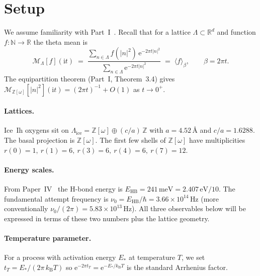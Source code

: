 \documentclass[11pt,letterpaper]{article}
\theoremstyle{plain}
\theoremstyle{definition}
\newcommand{\Eisenstein}{\mathbb{Z}[\omega]}
\newcommand{\IceLat}{\Lambda_{\text{ice}}}
\newcommand{\R}{\mathbb{R}}
\newcommand{\Z}{\mathbb{Z}}
\newcommand{\N}{\mathbb{N}}
\newcommand{\Lat}{\Lambda}
\newcommand{\tmean}[1]{\mathcal{M}_{\Lat}[#1]}
\newcommand{\tmeaneis}[1]{\mathcal{M}_{\Eisenstein}[#1]}
\newcommand{\e}{\mathrm{e}}
\newcommand{\kB}{k_{\mathrm{B}}}
\begin{document}
\tableofcontents

\bigskip

\section{Setup}\label{sec:setup}

We assume familiarity with Part~I~\cite{MamounPartI}.  Recall that
for a lattice $\Lat\subset\R^d$ and function $f:\N\to\R$ the theta
mean is
\begin{equation}\label{eq:tm}
  \tmean{f}(\mathrm{i} t)\;=\;
  \frac{\sum_{n\in\Lat} f(|n|^2)\,\e^{-2\pi t |n|^2}}
       {\sum_{n\in\Lat}\e^{-2\pi t |n|^2}}
  \;=\; \langle f\rangle_{\beta},\qquad
  \beta=2\pi t.
\end{equation}
The equipartition theorem (Part~I, Theorem~3.4) gives
$\tmeaneis{|n|^2}(\mathrm{i} t)=(2\pi t)^{-1}+O(1)$ as $t\to 0^+$.

\paragraph{Lattices.}  Ice~Ih oxygens sit on
$\IceLat = \Eisenstein \oplus (c/a)\,\Z$ with $a=4.52\,\text{\AA}$
and $c/a=1.6288$.  The basal projection is $\Eisenstein$.  The first
few shells of $\Eisenstein$ have multiplicities
$r(0)=1,\ r(1)=6,\ r(3)=6,\ r(4)=6,\ r(7)=12$.

\paragraph{Energy scales.}  From Paper~IV~\cite{MamounPaperIV} the
H-bond energy is $E_{\text{HB}}=241\,\text{meV}=2.407\,\text{eV}/10$.
The fundamental attempt frequency is $\nu_0 = E_{\text{HB}}/\hbar =
3.66\times 10^{14}\,\text{Hz}$ (more conventionally
$\nu_0/(2\pi)=5.83\times 10^{13}\,\text{Hz}$).  All three observables
below will be expressed in terms of these two numbers plus the
lattice geometry.

\paragraph{Temperature parameter.}  For a process with activation
energy $E_*$ at temperature $T$, we set $t_T = E_*/(2\pi\,\kB T)$
so $\e^{-2\pi t_T} = \e^{-E_*/\kB T}$ is the standard Arrhenius
factor.

\end{document}
